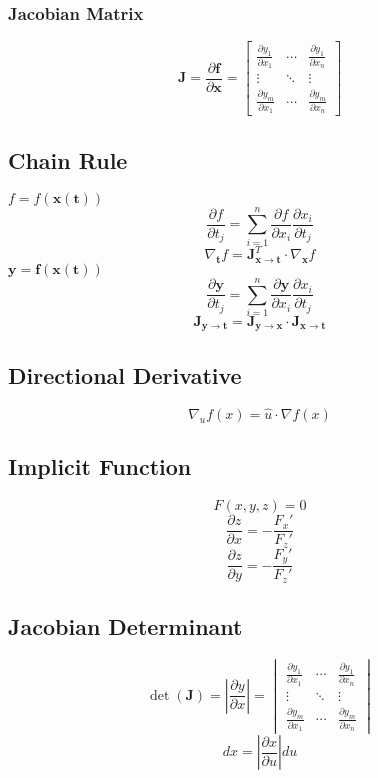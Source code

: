 \documentclass{article}
\begin{document}
\subsubsection{Jacobian Matrix}

\[
    \mathbf{J} = \frac{\partial \mathbf{f}}{\partial \mathbf{x}} =
    \begin{bmatrix}
        \frac{\partial y_1}{\partial x_1} & \cdots & \frac{\partial y_1}{\partial x_n} \\
        \vdots & \ddots & \vdots \\
        \frac{\partial y_m}{\partial x_1} & \cdots & \frac{\partial y_m}{\partial x_n}
    \end{bmatrix}
\]

\subsection{Chain Rule}

$f = f(\mathbf{x}(\mathbf{t}))$
\[
    \frac{\partial f}{\partial t_j} = \sum_{i=1}^n \frac{\partial f}{\partial x_i} \frac{\partial x_i}{\partial t_j}
\]
\[
    \nabla_{\mathbf{t}} f = \mathbf{J}_{\mathbf{x} \to \mathbf{t}}^T \cdot \nabla_{\mathbf{x}} f
\]
$\mathbf{y} = \mathbf{f}(\mathbf{x}(\mathbf{t}))$
\[
    \frac{\partial \mathbf{y}}{\partial t_j} = \sum_{i=1}^n \frac{\partial \mathbf{y}}{\partial x_i} \frac{\partial x_i}{\partial t_j}
\]
\[
    \mathbf{J}_{\mathbf{y} \to \mathbf{t}} = \mathbf{J}_{\mathbf{y} \to \mathbf{x}} \cdot \mathbf{J}_{\mathbf{x} \to \mathbf{t}}
\]

\subsection{Directional Derivative}

\[
    \nabla_u f(x) = \hat{u} \cdot \nabla f(x)
\]

\subsection{Implicit Function}

\[
    F(x, y, z) = 0
\]
\[
    \frac{\partial z}{\partial x} = -\frac{F_x'}{F_z'}
\]
\[
    \frac{\partial z}{\partial y} = -\frac{F_y'}{F_z'}
\]

\subsection{Jacobian Determinant}

\[
    \det(\mathbf{J}) = \left|\frac{\partial y}{\partial x}\right| = \begin{vmatrix}
        \frac{\partial y_1}{\partial x_1} & \cdots & \frac{\partial y_1}{\partial x_n} \\
        \vdots & \ddots & \vdots \\
        \frac{\partial y_m}{\partial x_1} & \cdots & \frac{\partial y_m}{\partial x_n}
    \end{vmatrix}
\]
\[
    dx = \left|\frac{\partial x}{\partial u}\right| du
\]
\end{document}
